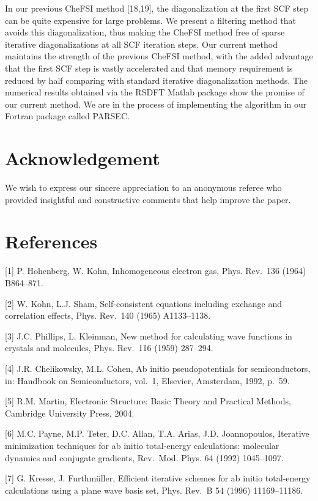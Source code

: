 \documentclass[
  10
]{article}
\begin{document}
In our previous CheFSI method {[}18,19{]}, the diagonalization at the
first SCF step can be quite expensive for large problems. We present a
filtering method that avoids this diagonalization, thus making the
CheFSI method free of sparse iterative diagonalizations at all SCF
iteration steps. Our current method maintains the strength of the
previous CheFSI method, with the added advantage that the first SCF step
is vastly accelerated and that memory requirement is reduced by half
comparing with standard iterative diagonalization methods. The numerical
results obtained via the RSDFT Matlab package show the promise of our
current method. We are in the process of implementing the algorithm in
our Fortran package called PARSEC.

\section{Acknowledgement}\label{acknowledgement}

We wish to express our sincere appreciation to an anonymous referee who
provided insightful and constructive comments that help improve the
paper.

\section{References}\label{references}

{[}1{]} P. Hohenberg, W. Kohn, Inhomogeneous electron gas, Phys.
Rev.~136 (1964) B864--871.

{[}2{]} W. Kohn, L.J. Sham, Self-consistent equations including exchange
and correlation effects, Phys. Rev.~140 (1965) A1133--1138.

{[}3{]} J.C. Phillips, L. Kleinman, New method for calculating wave
functions in crystals and molecules, Phys. Rev.~116 (1959) 287--294.

{[}4{]} J.R. Chelikowsky, M.L. Cohen, Ab initio pseudopotentials for
semiconductors, in: Handbook on Semiconductors, vol.~1, Elsevier,
Amsterdam, 1992, p.~59.

{[}5{]} R.M. Martin, Electronic Structure: Basic Theory and Practical
Methods, Cambridge University Press, 2004.

{[}6{]} M.C. Payne, M.P. Teter, D.C. Allan, T.A. Arias, J.D.
Joannopoulos, Iterative minimization techniques for ab initio
total-energy calculations: molecular dynamics and conjugate gradients,
Rev.~Mod. Phys. 64 (1992) 1045--1097.

{[}7{]} G. Kresse, J. Furthmüller, Efficient iterative schemes for ab
initio total-energy calculations using a plane wave basis set, Phys.
Rev.~B 54 (1996) 11169--11186.
\end{document}

